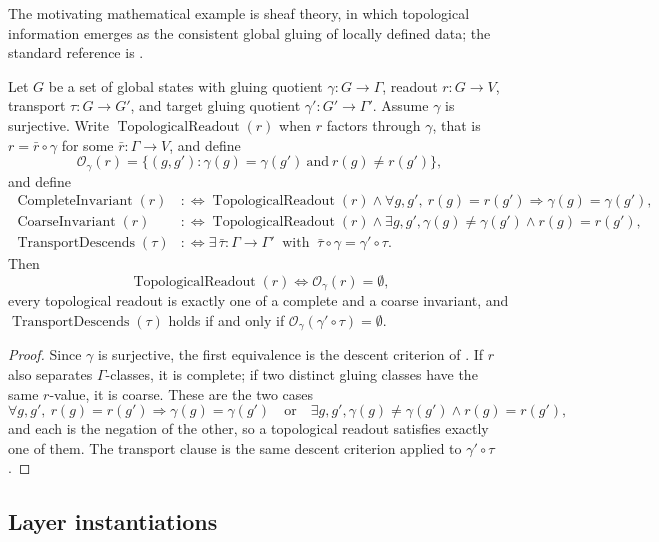 The motivating mathematical example is sheaf theory, in which
topological information emerges as the consistent global gluing of
locally defined data; the standard reference is
\citet{MacLaneMoerdijk1992Sheaves}.

\begin{theorem}\label{thm:F48}
Let \(G\) be a set of global states with gluing quotient
\(\gamma:G\to\Gamma\), readout \(r:G\to V\), transport
\(\tau:G\to G'\), and target gluing quotient \(\gamma':G'\to\Gamma'\).
Assume \(\gamma\) is surjective. Write
\(\operatorname{TopologicalReadout}(r)\) when \(r\) factors through \(\gamma\),
that is \(r=\bar r\circ\gamma\) for some \(\bar r:\Gamma\to V\), and define
\[
  \mathcal O_\gamma(r)=
  \{(g,g'):\gamma(g)=\gamma(g')\ \text{and}\ r(g)\ne r(g')\},
\]
and define
\begin{align*}
  \operatorname{CompleteInvariant}(r)
  &:\Longleftrightarrow \operatorname{TopologicalReadout}(r)\wedge
    \forall g,g',\ r(g)=r(g')\Rightarrow \gamma(g)=\gamma(g'),\\
  \operatorname{CoarseInvariant}(r)
  &:\Longleftrightarrow \operatorname{TopologicalReadout}(r)\wedge
    \exists g,g',\gamma(g)\ne\gamma(g')\wedge r(g)=r(g'),\\
  \operatorname{TransportDescends}(\tau)
  &:\Longleftrightarrow
    \exists\,\bar\tau:\Gamma\to\Gamma'\ \text{ with }\
    \bar\tau\circ\gamma=\gamma'\circ\tau .
\end{align*}
Then
\[
  \operatorname{TopologicalReadout}(r)\iff\mathcal O_\gamma(r)=\emptyset,
\]
every topological readout is exactly one of a complete and a coarse
invariant, and \(\operatorname{TransportDescends}(\tau)\) holds if and only if
\(\mathcal O_\gamma(\gamma'\circ\tau)=\emptyset\).
\end{theorem}
\begin{proof}
Since \(\gamma\) is surjective, the first equivalence is the descent
criterion of \Cref{sec:apparatus}.  If \(r\) also separates \(\Gamma\)-classes, it is complete; if two
distinct gluing classes have the same \(r\)-value, it is coarse. These
are the two cases
\[
  \forall g,g',\ r(g)=r(g')\Rightarrow\gamma(g)=\gamma(g')
  \quad\text{or}\quad
  \exists g,g',\gamma(g)\ne\gamma(g')\wedge r(g)=r(g'),
\]
and each is the negation of the other, so a topological readout satisfies
exactly one of them. The transport clause is the same descent criterion applied to
\(\gamma'\circ\tau\).
\end{proof}

\subsection*{Layer instantiations}\label{layer-inst:F48}

